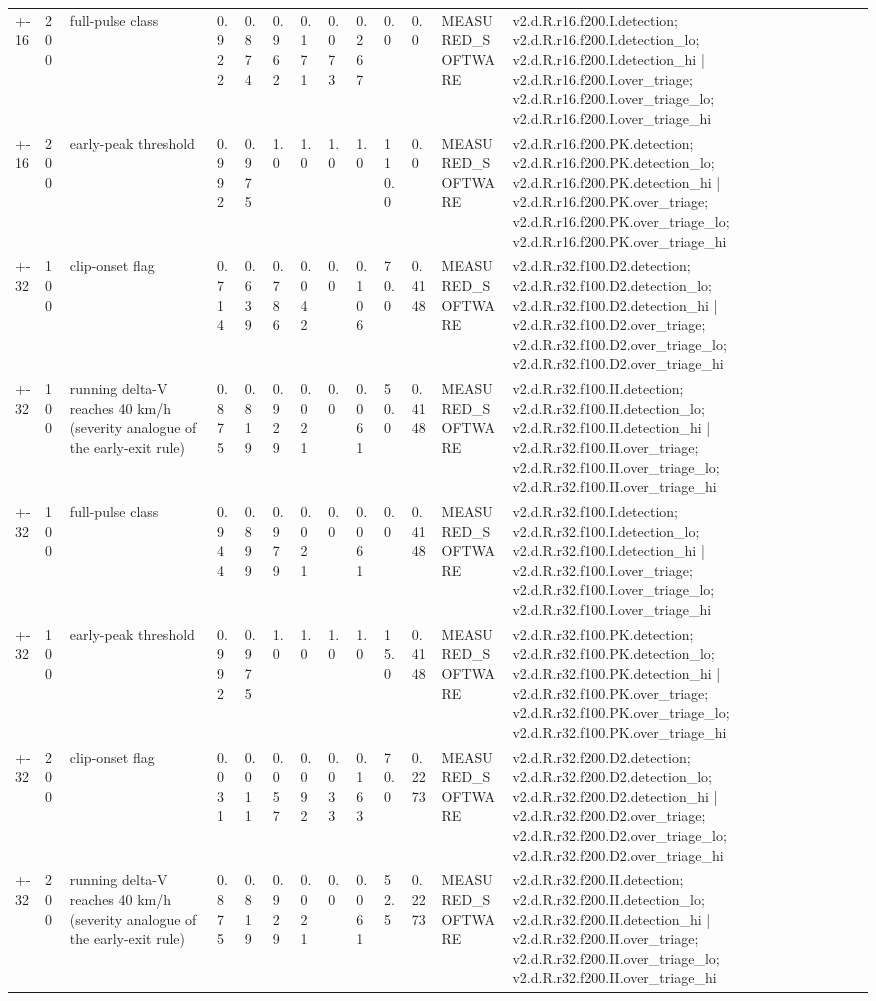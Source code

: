 \begin{table}[t]
\begin{tabular}{lllllllllllll}
+-16 & 200 & full-pulse class & 0.922 & 0.874 & 0.962 & 0.171 & 0.073 & 0.267 & 0.0 & 0.0 & MEASURED\_SOFTWARE & v2.d.R.r16.f200.I.detection; v2.d.R.r16.f200.I.detection\_lo; v2.d.R.r16.f200.I.detection\_hi | v2.d.R.r16.f200.I.over\_triage; v2.d.R.r16.f200.I.over\_triage\_lo; v2.d.R.r16.f200.I.over\_triage\_hi \\
+-16 & 200 & early-peak threshold & 0.992 & 0.975 & 1.0 & 1.0 & 1.0 & 1.0 & 110.0 & 0.0 & MEASURED\_SOFTWARE & v2.d.R.r16.f200.PK.detection; v2.d.R.r16.f200.PK.detection\_lo; v2.d.R.r16.f200.PK.detection\_hi | v2.d.R.r16.f200.PK.over\_triage; v2.d.R.r16.f200.PK.over\_triage\_lo; v2.d.R.r16.f200.PK.over\_triage\_hi \\
+-32 & 100 & clip-onset flag & 0.714 & 0.639 & 0.786 & 0.042 & 0.0 & 0.106 & 70.0 & 0.4148 & MEASURED\_SOFTWARE & v2.d.R.r32.f100.D2.detection; v2.d.R.r32.f100.D2.detection\_lo; v2.d.R.r32.f100.D2.detection\_hi | v2.d.R.r32.f100.D2.over\_triage; v2.d.R.r32.f100.D2.over\_triage\_lo; v2.d.R.r32.f100.D2.over\_triage\_hi \\
+-32 & 100 & running delta-V reaches 40 km/h (severity analogue of the early-exit rule) & 0.875 & 0.819 & 0.929 & 0.021 & 0.0 & 0.061 & 50.0 & 0.4148 & MEASURED\_SOFTWARE & v2.d.R.r32.f100.II.detection; v2.d.R.r32.f100.II.detection\_lo; v2.d.R.r32.f100.II.detection\_hi | v2.d.R.r32.f100.II.over\_triage; v2.d.R.r32.f100.II.over\_triage\_lo; v2.d.R.r32.f100.II.over\_triage\_hi \\
+-32 & 100 & full-pulse class & 0.944 & 0.899 & 0.979 & 0.021 & 0.0 & 0.061 & 0.0 & 0.4148 & MEASURED\_SOFTWARE & v2.d.R.r32.f100.I.detection; v2.d.R.r32.f100.I.detection\_lo; v2.d.R.r32.f100.I.detection\_hi | v2.d.R.r32.f100.I.over\_triage; v2.d.R.r32.f100.I.over\_triage\_lo; v2.d.R.r32.f100.I.over\_triage\_hi \\
+-32 & 100 & early-peak threshold & 0.992 & 0.975 & 1.0 & 1.0 & 1.0 & 1.0 & 15.0 & 0.4148 & MEASURED\_SOFTWARE & v2.d.R.r32.f100.PK.detection; v2.d.R.r32.f100.PK.detection\_lo; v2.d.R.r32.f100.PK.detection\_hi | v2.d.R.r32.f100.PK.over\_triage; v2.d.R.r32.f100.PK.over\_triage\_lo; v2.d.R.r32.f100.PK.over\_triage\_hi \\
+-32 & 200 & clip-onset flag & 0.031 & 0.011 & 0.057 & 0.092 & 0.033 & 0.163 & 70.0 & 0.2273 & MEASURED\_SOFTWARE & v2.d.R.r32.f200.D2.detection; v2.d.R.r32.f200.D2.detection\_lo; v2.d.R.r32.f200.D2.detection\_hi | v2.d.R.r32.f200.D2.over\_triage; v2.d.R.r32.f200.D2.over\_triage\_lo; v2.d.R.r32.f200.D2.over\_triage\_hi \\
+-32 & 200 & running delta-V reaches 40 km/h (severity analogue of the early-exit rule) & 0.875 & 0.819 & 0.929 & 0.021 & 0.0 & 0.061 & 52.5 & 0.2273 & MEASURED\_SOFTWARE & v2.d.R.r32.f200.II.detection; v2.d.R.r32.f200.II.detection\_lo; v2.d.R.r32.f200.II.detection\_hi | v2.d.R.r32.f200.II.over\_triage; v2.d.R.r32.f200.II.over\_triage\_lo; v2.d.R.r32.f200.II.over\_triage\_hi \\

\end{tabular}
\end{table}
